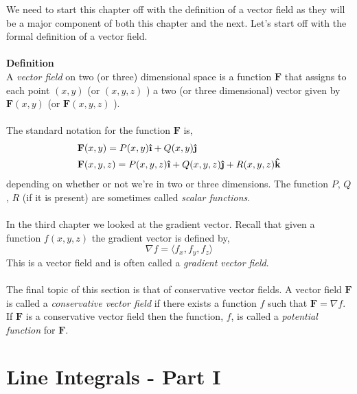 \documentclass[10pt,reqno]{book}
\theoremstyle{definition}
\renewcommand{\vec}[1]{\mathbf{#1}}
\newcommand{\uvec}[1]{\boldsymbol{\hat{\textbf{#1}}}}
\begin{document}
	We need to start this chapter off with the definition of a vector field as they will be a major component of both this chapter and the next. Let's start off with the formal definition of a vector field.\\ \\
	\textbf{Definition}\\
	A \textit{vector field} on two (or three) dimensional space is a function $ \vec{F} $ that assigns to each point $ (x,y) $ (or $ (x,y,z) $ ) a two (or three dimensional) vector given by $ \vec{F}(x,y) $ (or $ \vec{F}(x,y,z) $ ).\\ \\
	The standard notation for the function $ \vec{F} $ is,
	\begin{align*}
		& \vec{F}(x,y) = P(x,y)\uvec{\i} + Q(x,y)\uvec{\j}\\
		& \vec{F}(x,y,z) = P(x,y,z)\uvec{\i} + Q(x,y,z)\uvec{\j} + R(x,y,z)\uvec{k}
	\end{align*}
	depending on whether or not we're in two or three dimensions. The function $ P $, $ Q $, $ R $ (if it is present) are sometimes called \textit{scalar functions}.\\ \\
	In the third chapter we looked at the gradient vector. Recall that given a function $ f(x,y,z) $ the gradient vector is defined by,
	\[ \nabla f = \langle f_x,f_y,f_z \rangle \]
	This is a vector field and is often called a \textit{gradient vector field}.\\ \\
	The final topic of this section is that of conservative vector fields. A vector field $ \vec{F} $ is called a \textit{conservative vector field} if there exists a function $ f $ such that $ \vec{F} = \nabla f $. If $ \vec{F} $ is a conservative vector field then the function, $ f $, is called a \textit{potential function} for $ \vec{F} $.
	
	\section{Line Integrals - Part I}
	
\end{document}
